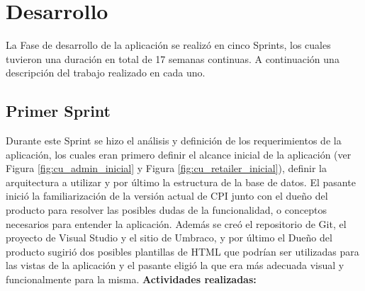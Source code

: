 \section{Desarrollo}
La Fase de desarrollo de la aplicación se realizó en cinco Sprints, los cuales tuvieron una duración en total de 17 semanas continuas. A continuación una descripción del trabajo realizado en cada uno.

\subsection{Primer Sprint}
Durante este Sprint se hizo el análisis y definición de los requerimientos de la aplicación, los cuales eran primero definir el alcance inicial de la aplicación (ver Figura \ref{fig:cu_admin_inicial} y Figura \ref{fig:cu_retailer_inicial}), definir la arquitectura a utilizar y por último la estructura de la base de datos. El pasante inició la familiarización de la versión actual de CPI junto con el dueño del producto para resolver las posibles dudas de la funcionalidad, o conceptos necesarios para entender la aplicación. Además se creó el repositorio de Git, el proyecto de Visual Studio y el sitio de Umbraco, y por último el Dueño del producto sugirió dos posibles plantillas de HTML que podrían ser utilizadas para las vistas de la aplicación y el pasante eligió la que era más adecuada visual y funcionalmente para la misma.
\vskip 0.5cm
\textbf{Actividades realizadas:}
